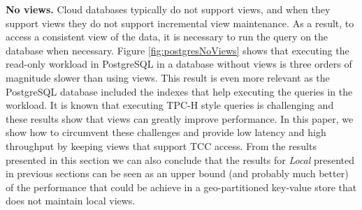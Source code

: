\documentclass[sigplan,twocolumn,review,anonymous]{acmart}
\begin{document}
\noindent
\textbf{No views.} %
Cloud databases typically do not support views, and when they support views they do not support incremental view maintenance.
As a result, to access a consistent view of the data, it is necessary to run the query on the database when necessary.
Figure \ref{fig:postgresNoViews} shows that executing the read-only workload in PostgreSQL in 
a database without views is three orders of magnitude slower than using views.
This result is even more relevant as the PostgreSQL database included the indexes that help executing the
queries in the workload. 
It is known that executing TPC-H style queries is challenging \cite{dreseler20quantifying} and these 
results show that views can greatly improve performance. 
In this paper, we show how to circumvent these challenges and provide low latency and high throughput 
by keeping views that support TCC access.
From the results presented in this section we can also conclude that the results for \textit{Local} presented in previous sections can be seen
as an upper bound (and probably much better) of the performance that could be achieve in a geo-partitioned key-value store that 
does not maintain local views. 


\end{document}
